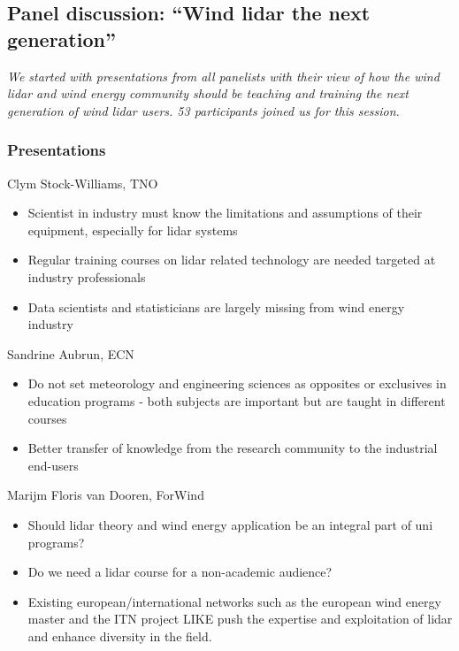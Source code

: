\subsection{Panel discussion: \enquote{Wind lidar the next generation}}

\emph{We started with presentations from all panelists with their view of how the wind lidar and wind energy community should be teaching and training the next generation of wind lidar users. 53 participants joined us for this session.}

\subsubsection{Presentations}

Clym Stock-Williams, TNO

\begin{itemize}
	\item Scientist in industry must know the limitations and assumptions of their equipment, especially for lidar systems
	\item Regular training courses on lidar related technology are needed targeted at industry professionals
	\item Data scientists and statisticians are largely missing from wind energy industry
\end{itemize}

Sandrine Aubrun, ECN

\begin{itemize}
	\item Do not set meteorology and engineering sciences as opposites or exclusives in education programs - both subjects are important but are taught in different courses
	\item Better transfer of knowledge from the research community to the industrial end-users
\end{itemize}

Marijm Floris van Dooren, ForWind

\begin{itemize}
	\item Should lidar theory and wind energy application be an integral part of uni programs?
	\item Do we need a lidar course for a non-academic audience?
	\item Existing european/international networks such as the european wind energy master and the ITN project LIKE push the expertise and exploitation of lidar and enhance diversity in the field.
\end{itemize}

